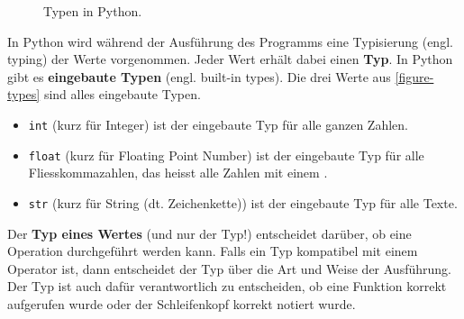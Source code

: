 \begin{figure}[htb]
\begin{minipage}{0.45\textwidth}
{
}
\caption{Typen in Python.}
\label{figure-types}
\end{minipage}
\end{figure}

In Python wird während der Ausführung des Programms eine Typisierung (engl. typing) der Werte vorgenommen. Jeder Wert erhält dabei einen \textbf{Typ}. In Python gibt es \textbf{eingebaute Typen} (engl. built-in types). Die drei Werte aus \autoref{figure-types} sind alles eingebaute Typen.

\begin{itemize}
\item \lstinline{int} (kurz für Integer) ist der eingebaute Typ für alle ganzen Zahlen.
\item \lstinline{float} (kurz für Floating Point Number) ist der eingebaute Typ für alle Fliesskommazahlen, das heisst alle Zahlen mit einem .
\item \lstinline{str} (kurz für String (dt. Zeichenkette)) ist der eingebaute Typ für alle Texte.
\end{itemize}

\begin{important}
Der \textbf{Typ eines Wertes} (und nur der Typ!) entscheidet darüber, ob eine Operation durchgeführt werden kann. Falls ein Typ kompatibel mit einem Operator ist, dann entscheidet der Typ über die Art und Weise der Ausführung. Der Typ ist auch dafür verantwortlich zu entscheiden, ob eine Funktion korrekt aufgerufen wurde oder der Schleifenkopf korrekt notiert wurde.
\end{important}

